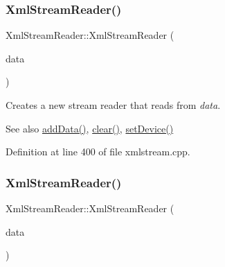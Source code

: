 \mbox{\label{class_xml_stream_reader_a5e3dd56e92748dcb914a1d4444ec58dc}} 
\subsubsection{\texorpdfstring{Xml\+Stream\+Reader()}{XmlStreamReader()}\hspace{0.1cm}{\footnotesize\ttfamily [3/5]}}
{\footnotesize\ttfamily Xml\+Stream\+Reader\+::\+Xml\+Stream\+Reader (\begin{DoxyParamCaption}\item[{const Q\+Byte\+Array \&}]{data }\end{DoxyParamCaption})\hspace{0.3cm}{\ttfamily [explicit]}}

Creates a new stream reader that reads from {\itshape data}.

\begin{DoxySeeAlso}{See also}
\hyperlink{class_xml_stream_reader_add6baa0f8790fc528c1fa6e05755f96b}{add\+Data()}, \hyperlink{class_xml_stream_reader_a2a67f5a1fff83d33214ccc9ec9494ca0}{clear()}, \hyperlink{class_xml_stream_reader_a0d166c5c7814d44a0015a82f0500cee5}{set\+Device()} 
\end{DoxySeeAlso}


Definition at line 400 of file xmlstream.\+cpp.

\mbox{\label{class_xml_stream_reader_adf9a5f6b6a076f53e62d5c414139f5dd}} 
\subsubsection{\texorpdfstring{Xml\+Stream\+Reader()}{XmlStreamReader()}\hspace{0.1cm}{\footnotesize\ttfamily [4/5]}}
{\footnotesize\ttfamily Xml\+Stream\+Reader\+::\+Xml\+Stream\+Reader (\begin{DoxyParamCaption}\item[{const Q\+String \&}]{data }\end{DoxyParamCaption})\hspace{0.3cm}{\ttfamily [explicit]}}

